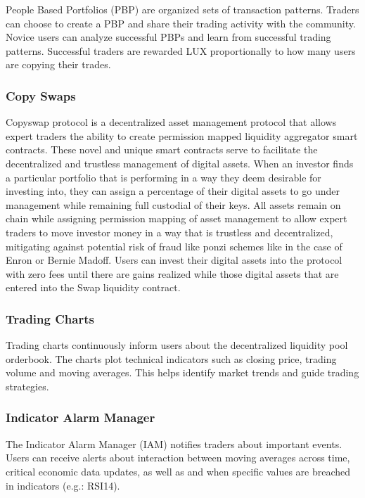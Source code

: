 \documentclass[11pt]{article}
\begin{document}
People Based Portfolios (PBP) are organized sets of transaction patterns. Traders can choose to create a PBP and share their trading activity with the community. Novice users can analyze successful PBPs and learn from successful trading patterns. Successful traders are rewarded LUX proportionally to how many users are copying their trades.


\subsubsection{Copy Swaps}

Copyswap protocol is a decentralized asset management protocol that allows expert traders the ability to create permission mapped liquidity aggregator smart contracts. These novel and unique smart contracts serve to facilitate the decentralized and trustless management of digital assets.  When an investor finds a particular portfolio that is performing in a way they deem desirable for investing into, they can assign a percentage  of their digital assets to go under management while remaining full custodial of their keys. All assets remain on chain while assigning permission mapping of asset management to allow expert traders to move investor money in a way that is trustless and decentralized, mitigating against potential risk of fraud like ponzi schemes like in the case of Enron or Bernie Madoff. Users can invest their digital assets into the protocol with zero fees until there are gains realized while those digital assets that are entered into the Swap liquidity contract.


\subsubsection{Trading Charts}

Trading charts continuously inform users about the decentralized liquidity pool orderbook. The charts plot technical indicators such as closing price, trading volume and moving averages.  This helps identify market trends and guide trading strategies.


\subsubsection{Indicator Alarm Manager}

The Indicator Alarm Manager (IAM) notifies traders about important events. Users can receive alerts about interaction between moving averages across time, critical economic data updates, as well as and when specific values are breached in indicators (e.g.: RSI14).
\end{document}
